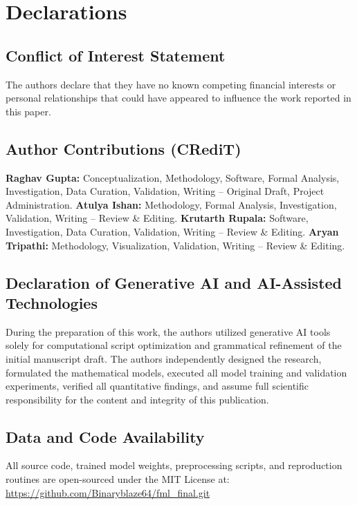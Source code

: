 \documentclass[11pt]{article}
\begin{document}
\section*{Declarations}

\subsection*{Conflict of Interest Statement}
The authors declare that they have no known competing financial interests or personal relationships that could have appeared to influence the work reported in this paper.

\subsection*{Author Contributions (CRediT)}
\textbf{Raghav Gupta:} Conceptualization, Methodology, Software, Formal Analysis, Investigation, Data Curation, Validation, Writing -- Original Draft, Project Administration. \textbf{Atulya Ishan:} Methodology, Formal Analysis, Investigation, Validation, Writing -- Review \& Editing. \textbf{Krutarth Rupala:} Software, Investigation, Data Curation, Validation, Writing -- Review \& Editing. \textbf{Aryan Tripathi:} Methodology, Visualization, Validation, Writing -- Review \& Editing.

\subsection*{Declaration of Generative AI and AI-Assisted Technologies}
During the preparation of this work, the authors utilized generative AI tools solely for computational script optimization and grammatical refinement of the initial manuscript draft. The authors independently designed the research, formulated the mathematical models, executed all model training and validation experiments, verified all quantitative findings, and assume full scientific responsibility for the content and integrity of this publication.

\subsection*{Data and Code Availability}
All source code, trained model weights, preprocessing scripts, and reproduction routines are open-sourced under the MIT License at: \url{https://github.com/Binaryblaze64/fml_final.git}
\end{document}
